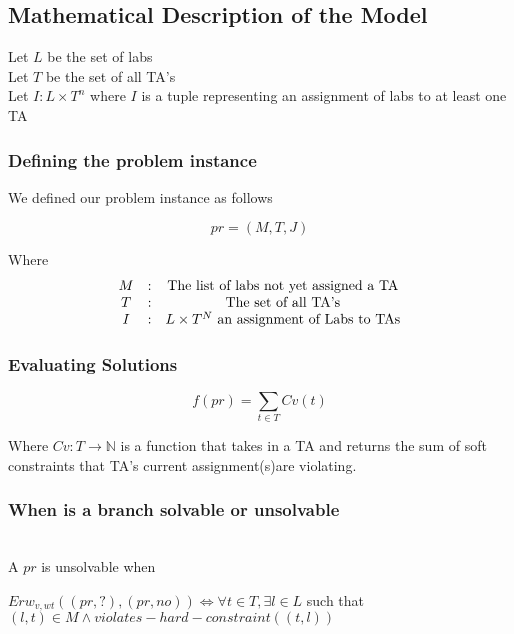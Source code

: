 \documentclass{article}
\begin{document}
\subsection{Mathematical Description of the Model}

Let $L$ be the set of labs\\

Let $T$ be the set of all TA's\\

Let $I:L \times  T^n$ where $I$ is a tuple representing an assignment
of labs to at least one TA 

\subsubsection{Defining the problem instance}

We defined our problem instance as follows

\[
pr = (M, T, J)
\]

Where \\

\[
\begin{array}{c c c}
  M & : & \text{The list of labs not yet assigned a TA}\\
  T & : & \text{The set of all TA's}\\
  I & : & \text{$L \times  T^N$ an assignment of Labs to TAs}
\end{array}
\]

\subsubsection{Evaluating Solutions}

\[
f(pr) = \sum_{t \in T} Cv(t)
\]

Where $Cv: T \rightarrow \mathbb{N}$ is a function that takes in a TA
and returns the sum of soft constraints that TA's current
assignment(s)are violating. 

\subsubsection{When is a branch solvable or unsolvable}\\

A $pr$ is unsolvable when

\begin{center}
  $Erw_{v,wt}((pr, ?),(pr, no)) \iff \forall t \in T , \exists
  l \in L$ such that $(l, t) \in M \land violates-hard-constraint((t,l))$
\end{center}
\end{document}
